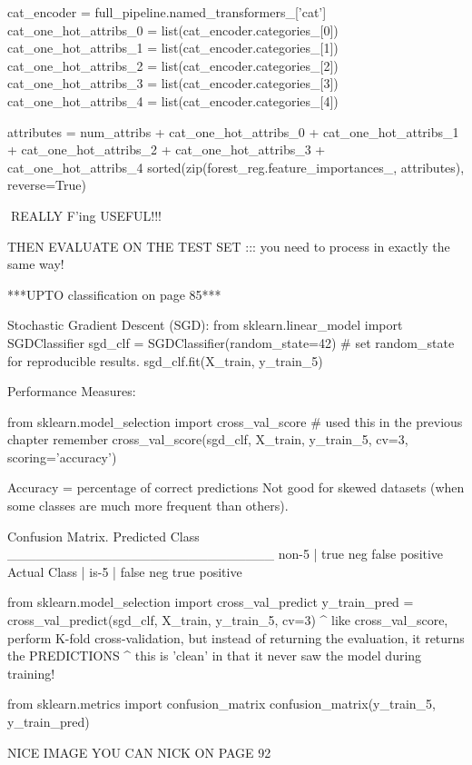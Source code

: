 cat_encoder = full_pipeline.named_transformers_['cat']
cat_one_hot_attribs_0 = list(cat_encoder.categories_[0])
cat_one_hot_attribs_1 = list(cat_encoder.categories_[1])
cat_one_hot_attribs_2 = list(cat_encoder.categories_[2])
cat_one_hot_attribs_3 = list(cat_encoder.categories_[3])
cat_one_hot_attribs_4 = list(cat_encoder.categories_[4])

attributes = num_attribs + cat_one_hot_attribs_0 + cat_one_hot_attribs_1 + cat_one_hot_attribs_2 + cat_one_hot_attribs_3 + cat_one_hot_attribs_4
sorted(zip(forest_reg.feature_importances_, attributes), reverse=True)

^^^REALLY F'ing USEFUL!!!

THEN EVALUATE ON THE TEST SET ::: you need to process in exactly the same way!













***UPTO classification on page 85***

Stochastic Gradient Descent (SGD):
from sklearn.linear_model import SGDClassifier
sgd_clf = SGDClassifier(random_state=42) # set random_state for reproducible results.
sgd_clf.fit(X_train, y_train_5)

Performance Measures:

from sklearn.model_selection import cross_val_score # used this in the previous chapter remember
cross_val_score(sgd_clf, X_train, y_train_5, cv=3, scoring='accuracy')

Accuracy = percentage of correct predictions
Not good for skewed datasets (when some classes are much more frequent than others).

Confusion Matrix.
                    Predicted Class
                    ____________________________
             non-5 | true neg     false positive
Actual Class       |
             is-5  | false neg    true positive

from sklearn.model_selection import cross_val_predict             
y_train_pred = cross_val_predict(sgd_clf, X_train, y_train_5, cv=3)
^ like cross_val_score, perform K-fold cross-validation,
but instead of returning the evaluation, it returns the PREDICTIONS
^ this is 'clean' in that it never saw the model during training!

from sklearn.metrics import confusion_matrix
confusion_matrix(y_train_5, y_train_pred)

NICE IMAGE YOU CAN NICK ON PAGE 92

